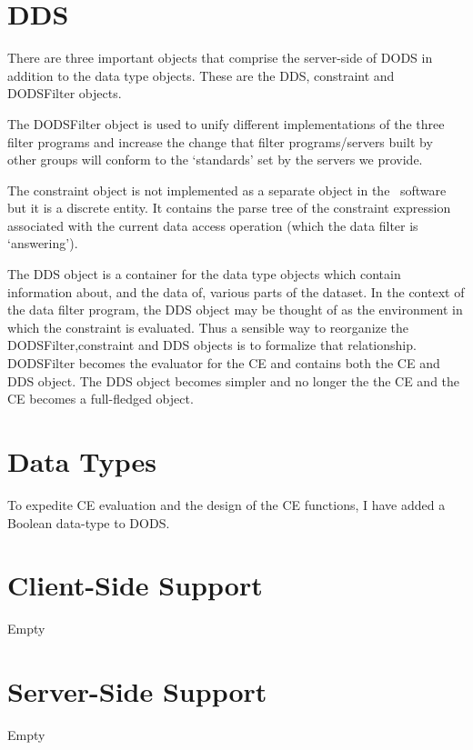 \documentclass[12pt]{article}
\begin{document}
\section{DDS}

There are three important objects that comprise the server-side of DODS in
addition to the data type objects. These are the DDS, constraint and
DODSFilter objects. 

The DODSFilter object is used to unify different implementations of the three
filter programs and increase the change that filter programs/servers built by
other groups will conform to the `standards' set by the servers we provide.

The constraint object is not implemented as a separate object in the \Cpp\
software but it is a discrete entity. It contains the parse tree of the
constraint expression associated with the current data access operation
(which the data filter is `answering').

The DDS object is a container for the data type objects which contain
information about, and the data of, various parts of the dataset. In the
context of the data filter program, the DDS object may be thought of as the
environment in which the constraint is evaluated. Thus a sensible way to
reorganize the DODSFilter,constraint and DDS objects is to formalize that
relationship. DODSFilter becomes the evaluator for the CE and contains both
the CE and DDS object. The DDS object becomes simpler and no longer the the
CE and the CE becomes a full-fledged object.

\section{Data Types}

To expedite CE evaluation and the design of the CE functions, I have added a
Boolean data-type to DODS.

\section{Client-Side Support}

Empty

\section{Server-Side Support}

Empty

\clearpage



\end{document}
